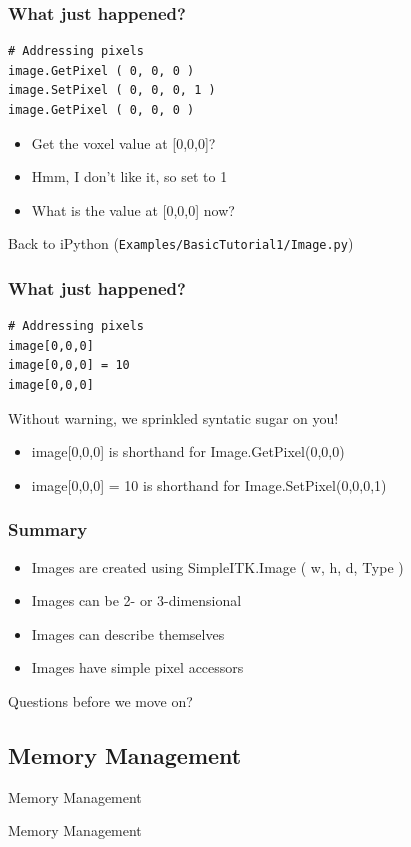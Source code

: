 \begin{frame}[fragile]
\frametitle{What just happened?}
\lstpython
\begin{lstlisting}
# Addressing pixels
image.GetPixel ( 0, 0, 0 )
image.SetPixel ( 0, 0, 0, 1 )
image.GetPixel ( 0, 0, 0 )
\end{lstlisting}
\begin{itemize}
  \item Get the voxel value at [0,0,0]?
  \item Hmm, I don't like it, so set to 1
  \item What is the value at [0,0,0] now?
\end{itemize}
Back to iPython (\texttt{Examples/BasicTutorial1/Image.py})
\end{frame}

\begin{frame}[fragile]
\frametitle{What just happened?}
\lstpython
\begin{lstlisting}
# Addressing pixels
image[0,0,0]
image[0,0,0] = 10
image[0,0,0]
\end{lstlisting}
Without warning, we sprinkled syntatic sugar on you!
\begin{itemize}
  \item image[0,0,0] is shorthand for Image.GetPixel(0,0,0)
  \item image[0,0,0] = 10 is shorthand for Image.SetPixel(0,0,0,1)
\end{itemize}
\end{frame}

\begin{frame}[fragile]
\frametitle{Summary}
\begin{itemize}
  \item Images are created using SimpleITK.Image ( w, h, d, Type )
  \item Images can be 2- or 3-dimensional
  \item Images can describe themselves
  \item Images have simple pixel accessors
\end{itemize}
Questions before we move on?
\end{frame}

\subsection{Memory Management}

\begin{frame}{Memory Management}
\fontsize{36pt}{36pt}\selectfont
\center
\begin{center}
Memory Management
\end{center}
\end{frame}


